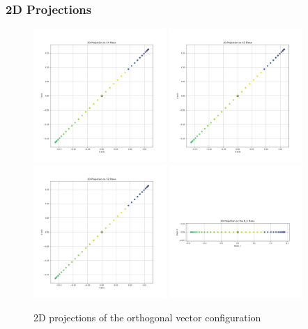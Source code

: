 \subsubsection{2D Projections}

\begin{figure}[H]
    \centering
    \includegraphics[width=0.45\textwidth]{figures/circle_xy.png}
    \includegraphics[width=0.45\textwidth]{figures/circle_xz.png}
    \includegraphics[width=0.45\textwidth]{figures/circle_yz.png}
    \includegraphics[width=0.45\textwidth]{figures/circle_r0.png}
    \caption{2D projections of the orthogonal vector configuration}
    \label{fig:example_default_2d}
\end{figure}

